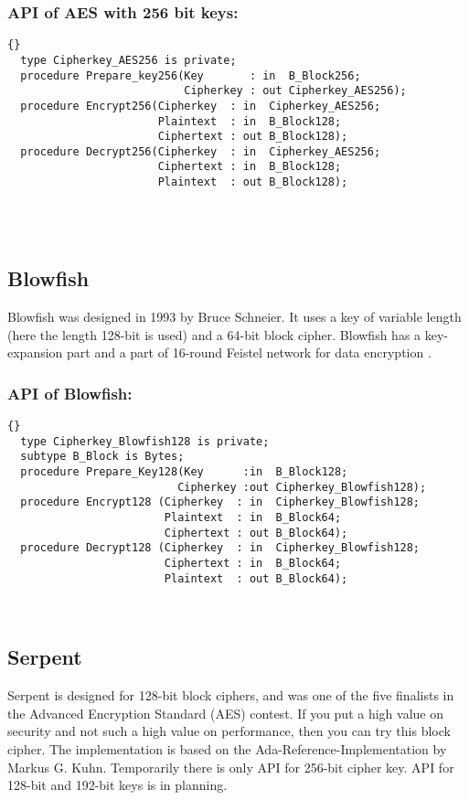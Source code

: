 \subsubsection*{API of AES with 256 bit keys:}
\begin{lstlisting}{}
  type Cipherkey_AES256 is private;
  procedure Prepare_key256(Key       : in  B_Block256;
                           Cipherkey : out Cipherkey_AES256);
  procedure Encrypt256(Cipherkey  : in  Cipherkey_AES256;
                       Plaintext  : in  B_Block128;
                       Ciphertext : out B_Block128);
  procedure Decrypt256(Cipherkey  : in  Cipherkey_AES256;
                       Ciphertext : in  B_Block128;
                       Plaintext  : out B_Block128);
\end{lstlisting}\\ \ \\
\subsection{Blowfish}
Blowfish was designed in 1993 by Bruce Schneier. It uses a key of variable length (here the length 128-bit is used) and a 64-bit block cipher. Blowfish has a key-expansion part and a part of 16-round Feistel network for data encryption \cite{DBLP:conf/fse/Schneier93}.
\subsubsection*{API of Blowfish:}
\begin{lstlisting}{}
  type Cipherkey_Blowfish128 is private;
  subtype B_Block is Bytes;
  procedure Prepare_Key128(Key      :in  B_Block128;
                          Cipherkey :out Cipherkey_Blowfish128);
  procedure Encrypt128 (Cipherkey  : in  Cipherkey_Blowfish128;
                        Plaintext  : in  B_Block64;
                        Ciphertext : out B_Block64);
  procedure Decrypt128 (Cipherkey  : in  Cipherkey_Blowfish128;
                        Ciphertext : in  B_Block64;
                        Plaintext  : out B_Block64);
\end{lstlisting}\\
\subsection{Serpent}
Serpent is designed for 128-bit block ciphers, and was one of the five finalists in the Advanced Encryption Standard (AES) contest. If you put a high value on security and not such a high value on performance, then you can try this block cipher. The implementation is based on the Ada-Reference-Implementation by Markus G. Kuhn. Temporarily there is only API for 256-bit cipher key. API for 128-bit and 192-bit keys is in planning.
